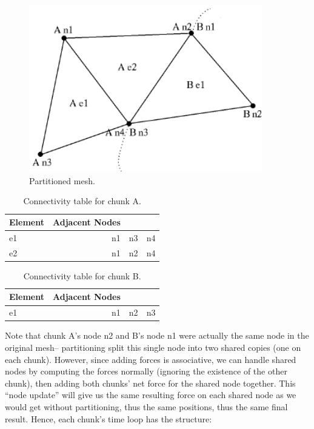 \documentclass[11pt]{article}
\begin{document}
\begin{figure}
\begin{center}
\includegraphics[width=4in]{partitioned_mesh}
\end{center}
\caption{Partitioned mesh.}
\label{fig:partitionedmesh}
\end{figure}

\begin{table}
\begin{tabular}{||l||r|r|r||}
\hline
Element & Adjacent Nodes \\ \hline
e1 & n1 & n3 & n4 \\
e2 & n1 & n2 & n4 \\
\hline
\end{tabular}
\caption{Connectivity table for chunk A.}
\label{table:chunkA}
\end{table}

\begin{table}
\begin{tabular}{||l||r|r|r||}
\hline
Element & Adjacent Nodes \\ \hline
e1 & n1 & n2 & n3 \\
\hline
\end{tabular}
\caption{Connectivity table for chunk B.}
\label{table:chunkB}
\end{table}

Note that chunk A's node n2 and B's node n1 were actually the same node in
the original mesh-- partitioning split this single node into two shared
copies (one on each chunk).  However, since adding forces is associative, we
can handle shared nodes by computing the forces normally (ignoring the
existence of the other chunk), then adding both chunks' net force for the
shared node together.  This ``node update'' will give us the same resulting
force on each shared node as we would get without partitioning, thus the
same positions, thus the same final result.  Hence, each chunk's time loop
has the structure:
\end{document}
